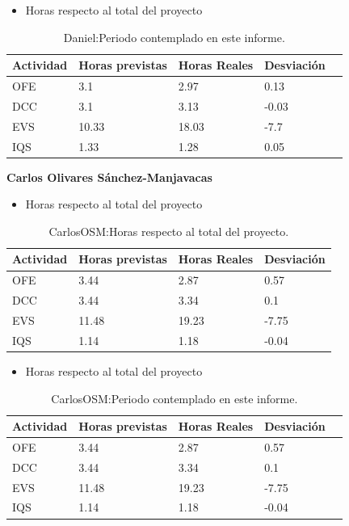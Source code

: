\begin{itemize}
\item Horas respecto al total del proyecto
\end{itemize}
\begin{table}[H]
\begin{center}
\begin{tabular}{ l l l l l }
  Actividad & Horas previstas & Horas Reales & Desviación \\ \hline \hline
  	OFE & 3.1 & 2.97 & 0.13 \\ \hline
  	DCC & 3.1 & 3.13 & -0.03 \\ \hline
  	EVS & 10.33 & 18.03 & -7.7 \\ \hline
  	IQS & 1.33 & 1.28 & 0.05 \\ \hline
\end{tabular}
\caption{Daniel:Periodo contemplado en este informe.}
\label{tab:Daniel:PeriodoContempladoInforme}
\end{center}
\end{table}

\textbf{Carlos Olivares Sánchez-Manjavacas}
\begin{itemize}
\item Horas respecto al total del proyecto
\end{itemize}
\begin{table}[H]
\begin{center}
\begin{tabular}{ l l l l }
  Actividad & Horas previstas & Horas Reales & Desviación \\ \hline \hline
    OFE & 3.44 & 2.87 & 0.57 \\ \hline
    DCC & 3.44 & 3.34 & 0.1 \\ \hline
    EVS & 11.48 & 19.23 & -7.75 \\ \hline
    IQS & 1.14 & 1.18 & -0.04 \\ \hline
\end{tabular}
\caption{CarlosOSM:Horas respecto al total del proyecto.}
\label{tab:CarlosOSM:HorasTotalInforme}
\end{center}
\end{table}

\begin{itemize}
\item Horas respecto al total del proyecto
\end{itemize}
\begin{table}[H]
\begin{center}
\begin{tabular}{ l l l l l }
  Actividad & Horas previstas & Horas Reales & Desviación \\ \hline \hline
    OFE & 3.44 & 2.87 & 0.57 \\ \hline
    DCC & 3.44 & 3.34 & 0.1 \\ \hline
    EVS & 11.48 & 19.23 & -7.75 \\ \hline
    IQS & 1.14 & 1.18 & -0.04 \\ \hline
\end{tabular}
\caption{CarlosOSM:Periodo contemplado en este informe.}
\label{tab:CarlosOSM:PeriodoContempladoInforme}
\end{center}
\end{table}

